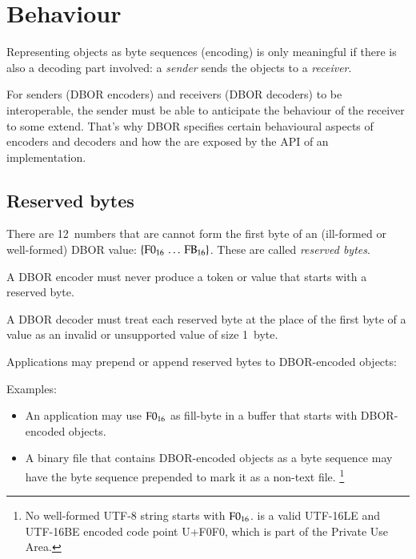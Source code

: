 
\section{Behaviour}
\label{sec:behaviour}

Representing objects as byte sequences (encoding) is only meaningful if there is also a decoding part involved:
a \emph{sender} sends the objects to a \emph{receiver}.

For senders (DBOR encoders) and receivers (DBOR decoders) to be interoperable, the sender must be able to anticipate the
behaviour of the receiver to some extend.
That's why DBOR specifies certain behavioural aspects of encoders and decoders and how the are exposed by the API
of an implementation.


\subsection{Reserved bytes}
\label{sec:reservedbytes}

There are 12~numbers that are cannot form the first byte of an (ill-formed or well-formed) DBOR value:
$\{\mathrm{F0}_{16} \,\ldots\, \mathrm{FB}_{16}\}$.
These are called \emph{reserved bytes}.

\medskip
A DBOR encoder must never produce a token or value that starts with a reserved byte.

A DBOR decoder must treat each reserved byte at the place of the first byte of a value
as an invalid or unsupported value of size 1~byte.

\medskip
Applications may prepend or append reserved bytes to DBOR-encoded objects:
\begin{BeginParPenalty}
    Examples:
    \begin{itemize}
        \item
        An application may use $\mathrm{F0}_{16}$ as fill-byte in a buffer that starts with
        DBOR-encoded objects.

        \item
        A binary file that contains DBOR-encoded objects as a byte sequence may have the byte sequence
         prepended to mark it as a non-text file.%
        \footnote{%
           No well-formed UTF-8 string starts with $\mathrm{F0}_{16}$.
            is a valid UTF-16LE and UTF-16BE encoded code point U+F0F0,
           which is part of the Private Use Area.
        }
    \end{itemize}
\end{BeginParPenalty}



